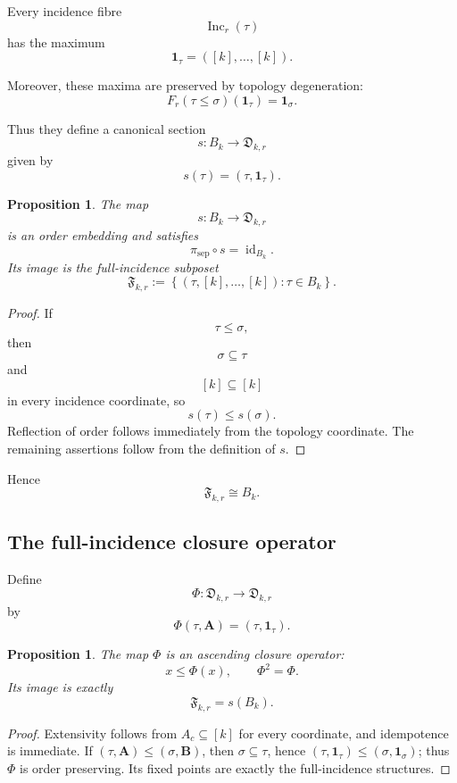 \documentclass[11pt]{article}
\theoremstyle{plain}
\newtheorem{proposition}[theorem]{Proposition}
\theoremstyle{definition}
\begin{document}
Every incidence fibre
\[
\operatorname{Inc}_r(\tau)
\]
has the maximum
\[
\mathbf1_\tau
=
([k],\ldots,[k]).
\]

Moreover, these maxima are preserved by topology degeneration:
\[
F_r(\tau\leq\sigma)(\mathbf1_\tau)
=
\mathbf1_\sigma.
\]

Thus they define a canonical section
\[
s:
B_k\longrightarrow\mathfrak D_{k,r}
\]
given by
\[
s(\tau)
=
(\tau,\mathbf1_\tau).
\]

\begin{proposition}
\label{prop:full-incidence-section}
The map
\[
s:B_k\to\mathfrak D_{k,r}
\]
is an order embedding and satisfies
\[
\pi_{\mathrm{sep}}\circ s
=
\operatorname{id}_{B_k}.
\]
Its image is the full-incidence subposet
\[
\mathfrak F_{k,r}
:=
\left\{
(\tau,[k],\ldots,[k]):
\tau\in B_k
\right\}.
\]
\end{proposition}

\begin{proof}
If
\[
\tau\leq\sigma,
\]
then
\[
\sigma\subseteq\tau
\]
and
\[
[k]\subseteq[k]
\]
in every incidence coordinate, so
\[
s(\tau)\leq s(\sigma).
\]
Reflection of order follows immediately from the topology coordinate.
The remaining assertions follow from the definition of $s$.
\end{proof}

Hence
\[
\mathfrak F_{k,r}
\cong
B_k.
\]

\subsection{The full-incidence closure operator}
\label{subsec:full-incidence-closure}

Define
\[
\Phi:
\mathfrak D_{k,r}
\longrightarrow
\mathfrak D_{k,r}
\]
by
\[
\Phi(\tau,\mathbf A)
=
(\tau,\mathbf1_\tau).
\]

\begin{proposition}
\label{prop:Phi-closure}
The map $\Phi$ is an ascending closure operator:
\[
x\leq\Phi(x),
\qquad
\Phi^2=\Phi.
\]
Its image is exactly
\[
\mathfrak F_{k,r}=s(B_k).
\]
\end{proposition}

\begin{proof}
Extensivity follows from $A_c\subseteq[k]$ for every coordinate, and idempotence is immediate.  If
$(\tau,\mathbf A)\leq(\sigma,\mathbf B)$, then $\sigma\subseteq\tau$, hence
$(\tau,\mathbf1_\tau)\leq(\sigma,\mathbf1_\sigma)$; thus $\Phi$ is order preserving.  Its fixed points are exactly the full-incidence structures.
\end{proof}
\end{document}

